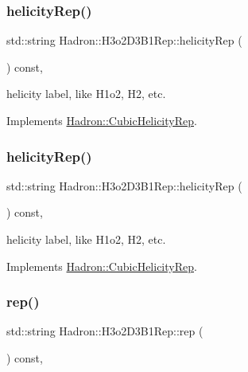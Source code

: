 \subsubsection{\texorpdfstring{helicityRep()}{helicityRep()}\hspace{0.1cm}{\footnotesize\ttfamily [2/3]}}
{\footnotesize\ttfamily std\+::string Hadron\+::\+H3o2\+D3\+B1\+Rep\+::helicity\+Rep (\begin{DoxyParamCaption}{ }\end{DoxyParamCaption}) const\hspace{0.3cm}{\ttfamily [inline]}, {\ttfamily [virtual]}}

helicity label, like H1o2, H2, etc. 

Implements \mbox{\hyperlink{structHadron_1_1CubicHelicityRep_af1096946b7470edf0a55451cc662f231}{Hadron\+::\+Cubic\+Helicity\+Rep}}.

\mbox{\label{structHadron_1_1H3o2D3B1Rep_a7d01a3bd011469f3f901f6bbaeaa0394}} 
\subsubsection{\texorpdfstring{helicityRep()}{helicityRep()}\hspace{0.1cm}{\footnotesize\ttfamily [3/3]}}
{\footnotesize\ttfamily std\+::string Hadron\+::\+H3o2\+D3\+B1\+Rep\+::helicity\+Rep (\begin{DoxyParamCaption}{ }\end{DoxyParamCaption}) const\hspace{0.3cm}{\ttfamily [inline]}, {\ttfamily [virtual]}}

helicity label, like H1o2, H2, etc. 

Implements \mbox{\hyperlink{structHadron_1_1CubicHelicityRep_af1096946b7470edf0a55451cc662f231}{Hadron\+::\+Cubic\+Helicity\+Rep}}.

\mbox{\label{structHadron_1_1H3o2D3B1Rep_acf8f745ca578c355ecbb4097e8c0ce39}} 
\subsubsection{\texorpdfstring{rep()}{rep()}\hspace{0.1cm}{\footnotesize\ttfamily [1/5]}}
{\footnotesize\ttfamily std\+::string Hadron\+::\+H3o2\+D3\+B1\+Rep\+::rep (\begin{DoxyParamCaption}{ }\end{DoxyParamCaption}) const\hspace{0.3cm}{\ttfamily [inline]}, {\ttfamily [virtual]}}



